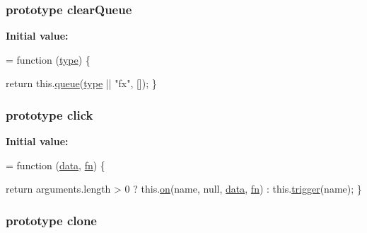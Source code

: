 \subsubsection[{\texorpdfstring{clear\+Queue}{clearQueue}}]{ {\bf prototype} clear\+Queue}\hypertarget{jquery-2_82_81-vsdoc_8js_ad0cc4718ee86b70a5fee95ed96e57fef}{}\label{jquery-2_82_81-vsdoc_8js_ad0cc4718ee86b70a5fee95ed96e57fef}
{\bfseries Initial value\+:}
\begin{DoxyCode}
= \textcolor{keyword}{function} (\hyperlink{jquery-2_82_81-vsdoc_8js_a3940565e83a9bfd10d95ffd27536da91}{type}) \{
        

        \textcolor{keywordflow}{return} this.\hyperlink{jquery-2_82_81-vsdoc_8js_a4a4ce67ab280eb2cff0622a3bdc1f5b3}{queue}(\hyperlink{jquery-2_82_81-vsdoc_8js_a3940565e83a9bfd10d95ffd27536da91}{type} || \textcolor{stringliteral}{"fx"}, []);
    \}
\end{DoxyCode}
\subsubsection[{\texorpdfstring{click}{click}}]{ {\bf prototype} click}\hypertarget{jquery-2_82_81-vsdoc_8js_ae91d3cae9d03efb8a330aaed1fc421c7}{}\label{jquery-2_82_81-vsdoc_8js_ae91d3cae9d03efb8a330aaed1fc421c7}
{\bfseries Initial value\+:}
\begin{DoxyCode}
= \textcolor{keyword}{function} (\hyperlink{jquery-2_82_81-vsdoc_8js_a609407b3456fdc3c5671a9fc4a226ff7}{data}, \hyperlink{jquery-2_82_81-vsdoc_8js_acef6bdaf6b9b20fdcca1ea86f0902c3b}{fn}) \{
        

        \textcolor{keywordflow}{return} arguments.length > 0 ?
            this.\hyperlink{jquery-2_82_81-vsdoc_8js_ae453b412b883f60220d73468ef6c6dbc}{on}(name, null, \hyperlink{jquery-2_82_81-vsdoc_8js_a609407b3456fdc3c5671a9fc4a226ff7}{data}, \hyperlink{jquery-2_82_81-vsdoc_8js_acef6bdaf6b9b20fdcca1ea86f0902c3b}{fn}) :
            this.\hyperlink{jquery-2_82_81-vsdoc_8js_a2388c4114d5e3e4eab020f973641519c}{trigger}(name);
    \}
\end{DoxyCode}
\subsubsection[{\texorpdfstring{clone}{clone}}]{ {\bf prototype} clone}\hypertarget{jquery-2_82_81-vsdoc_8js_a7d74ce76585989b4b6e2d506577e13ad}{}\label{jquery-2_82_81-vsdoc_8js_a7d74ce76585989b4b6e2d506577e13ad}

